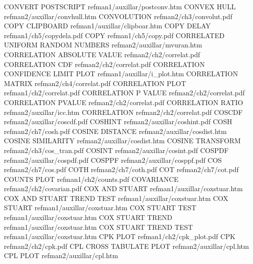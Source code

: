 CONVERT POSTSCRIPT                      refman1/auxillar/postconv.htm
CONVEX HULL                             refman2/auxillar/convhull.htm
CONVOLUTION                             refman2/ch3/convolut.pdf
COPY CLIPBOARD                          refman1/auxillar/clipboar.htm
COPY DELAY                              refman1/ch5/copydela.pdf
COPY                                    refman1/ch5/copy.pdf
CORRELATED UNIFORM RANDOM NUMBERS       refman2/auxillar/mvuran.htm
CORRELATION ABSOLUTE VALUE              refman2/ch2/correlat.pdf
CORRELATION CDF                         refman2/ch2/correlat.pdf
CORRELATION CONFIDENCE LIMIT PLOT       refman1/auxillar/i_plot.htm
CORRELATION MATRIX                      refman2/ch4/correlat.pdf
CORRELATION PLOT                        refman1/ch2/correlat.pdf
CORRELATION P VALUE                     refman2/ch2/correlat.pdf
CORRELATION PVALUE                      refman2/ch2/correlat.pdf
CORRELATION RATIO                       refman2/auxillar/icc.htm
CORRELATION                             refman2/ch2/correlat.pdf
COSCDF                                  refman2/auxillar/coscdf.pdf
COSHINT                                 refman2/auxillar/coshint.pdf
COSH                                    refman2/ch7/cosh.pdf
COSINE DISTANCE                         refman2/auxillar/cosdist.htm
COSINE SIMILARITY                       refman2/auxillar/cosdist.htm
COSINE TRANSFORM                        refman2/ch3/cos_tran.pdf
COSINT                                  refman2/auxillar/cosint.pdf
COSPDF                                  refman2/auxillar/cospdf.pdf
COSPPF                                  refman2/auxillar/cosppf.pdf
COS                                     refman2/ch7/cos.pdf
COTH                                    refman2/ch7/coth.pdf
COT                                     refman2/ch7/cot.pdf
COUNTS PLOT                             refman1/ch2/counts.pdf
COVARIANCE                              refman2/ch2/covarian.pdf
COX AND STUART                          refman1/auxillar/coxstuar.htm
COX AND STUART TREND TEST               refman1/auxillar/coxstuar.htm
COX STUART                              refman1/auxillar/coxstuar.htm
COX STUART TEST                         refman1/auxillar/coxstuar.htm
COX STUART TREND                        refman1/auxillar/coxstuar.htm
COX STUART TREND TEST                   refman1/auxillar/coxstuar.htm
CPK PLOT                                refman1/ch2/cpk_plot.pdf
CPK                                     refman2/ch2/cpk.pdf
CPL CROSS TABULATE PLOT                 refman2/auxillar/cpl.htm
CPL PLOT                                refman2/auxillar/cpl.htm
